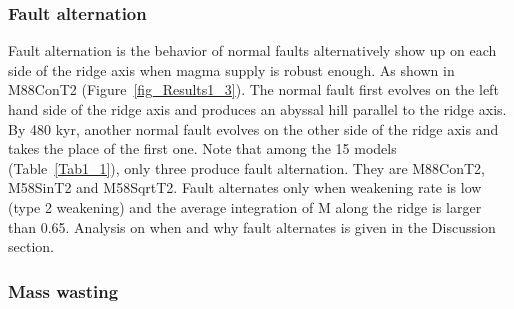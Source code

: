 \subsubsection{Fault alternation}

Fault alternation is the behavior of normal faults alternatively show up on each side of the ridge axis when magma supply is robust enough. As shown in M88ConT2 (Figure~\hyperref[fig_Results1_3]{\ref{fig_Results1_3}}). The normal fault first evolves on the left hand side of the ridge axis and produces an abyssal hill parallel to the ridge axis. By 480 kyr, another normal fault evolves on the other side of the ridge axis and takes the place of the first one. Note that among the 15 models (Table~\hyperref[Tab1_1]{\ref{Tab1_1}}), only three produce fault alternation. They are M88ConT2, M58SinT2 and M58SqrtT2. Fault alternates only when weakening rate is low (type 2 weakening) and the average integration of M along the ridge is larger than 0.65. Analysis on when and why fault alternates is given in the Discussion section.


\subsubsection{Mass wasting}\label{para_CutBack}


